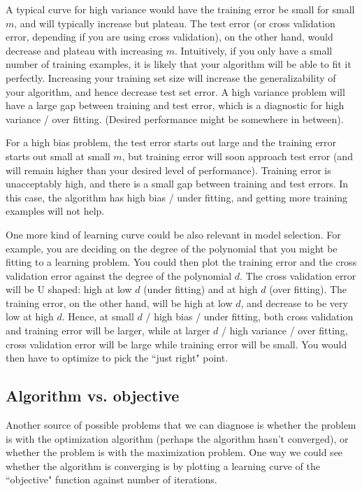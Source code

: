 \documentclass[letterpaper,10pt]{article}
\begin{document}
A typical curve for high variance would have the training error be small for small $m$, and will typically increase but plateau. The test error (or cross validation error, depending if you are using cross validation), on the other hand, would decrease and plateau with increasing $m$. Intuitively, if you only have a small number of training examples, it is likely that your algorithm will be able to fit it perfectly. Increasing your training set size will increase the generalizability of your algorithm, and hence decrease test set error. A high variance problem will have a large gap between training and test error, which is a diagnostic for high variance / over fitting. (Desired performance might be somewhere in between).

For a high bias problem, the test error starts out large and the training error starts out small at small $m$, but training error will soon approach test error (and will remain higher than your desired level of performance). Training error is unacceptably high, and there is a small gap between training and test errors. In this case, the algorithm has high bias / under fitting, and getting more training examples will not help.

One more kind of learning curve could be also relevant in model selection. For example, you are deciding on the degree of the polynomial that you might be fitting to a learning problem. You could then plot the training error and the cross validation error against the degree of the polynomial $d$. The cross validation error will be U shaped: high at low $d$ (under fitting) and at high $d$ (over fitting). The training error, on the other hand, will be high at low $d$, and decrease to be very low at high $d$. Hence, at small $d$ / high bias / under fitting, both cross validation and training error will be larger, while at larger $d$ / high variance / over fitting, cross validation error will be large while training error will be small. You would then have to optimize to pick the ``just right" point.


\subsection{Algorithm vs. objective}

Another source of possible problems that we can diagnose is whether the problem is with the optimization algorithm (perhaps the algorithm hasn't converged), or whether the problem is with the maximization problem. One way we could see whether the algorithm is converging is by plotting a learning curve of the ``objective" function against number of iterations.
\end{document}
